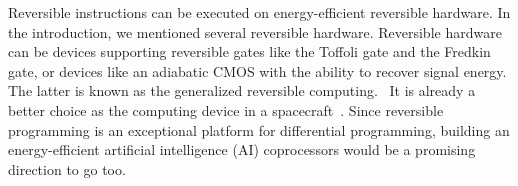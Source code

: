 \documentclass[aps,twocolumn,longbibliography,english,superscriptaddress]{revtex4-1}
\newcommand{\<}{\langle}
\renewcommand{\>}{\rangle}
\theoremstyle{definition}\newtheorem{definition}{\textit{Definition}}
\begin{document}
Reversible instructions can be executed on energy-efficient reversible hardware.
In the introduction, we mentioned several reversible hardware. Reversible hardware can be devices supporting reversible gates like the Toffoli gate and the Fredkin gate, or devices like an adiabatic CMOS with the ability to recover signal energy. The latter is known as the generalized reversible computing.~\cite{Frank2005,Frank2017b}
It is already a better choice as the computing device in a spacecraft~\cite{Debenedictis2017}.
Since reversible programming is an exceptional platform for differential programming, building an energy-efficient artificial intelligence (AI) coprocessors would be a promising direction to go too.
\end{document}
